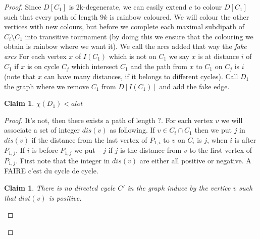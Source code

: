 \documentclass[10pt]{article}
\theoremstyle{plain}
\newtheorem{claim}[theorem]{Claim}
\theoremstyle{definition}
\theoremstyle{remark}
\begin{document}
\begin{proof}
Since $D[C_1]$ is 2k-degenerate, we can easily extend $c$ to colour $D[C_1]$ such that every path of length $9k$ is rainbow coloured. 
We will colour the other vertices with  new colours, but before we complete each maximal subdipath of $C_i \setminus C_1$ into transitive tournament
(by doing this we ensure that the colouring we obtain is rainbow where we want it). We call the arcs added that way the \textit{fake arcs}  
For each vertex $x$ of $I(C_1)$ which is not on $C_1$ we say $x$ is at distance $i$
of $C_1$ if $x$ is on cycle $C_j$ which intersect $C_1$ and the path from $x$ to $C_1$ on $C_j$ is $i$
(note that $x$ can have many distances, if it belongs to different cycles). Call $D_1$ the graph where we remove $C_1$ from $D[I(C_1)]$ and add the fake
edge.

\begin{claim}
$\chi(D_1) < a lot$ 
\end{claim}

\begin{proof}
It's not, then there exists a path of length ?. 
For each vertex $v$ we will associate a set of integer $dis(v)$ as following. If $v \in C_i \cap C_1$ then we put $j$ in $dis(v)$ if the distance
from the last vertex of $P_{1,i}$ to $v$ on $C_i$ is $j$, when $i$ is after $P_{1,j}$. If  $i$ is before $P_{1,j}$ we put $-j$ if $j$ is the distance from
$v$ to the first vertex of $P_{1,j}$. 
First note that the integer in $dis(v)$ are either all positive or negative. A FAIRE c'est du cycle de cycle.

\begin{claim}
There is no directed cycle $C'$ in the graph induce by the vertice $v$ such that $dist(v)$ is positive.
\end{claim}


\end{proof}
\end{proof}
\end{document}
